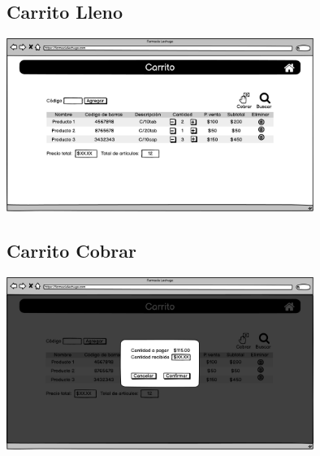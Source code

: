 \begin{flushleft}
	\subsection{Carrito Lleno} \label{UI: carrito agregar}
	\begin{center}
		\includegraphics[width=10cm]{pantallas/images/7carritolleno.png}\\	
		 	
	\end{center}
	\subsection{Carrito Cobrar} \label{UI: carrito Cobrar}
	\begin{center}
		\includegraphics[width=10cm]{pantallas/images/8carritocobrar.png}\\	
		 	
	\end{center}

\end{flushleft}
